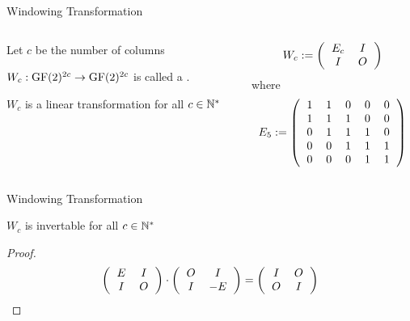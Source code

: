 \begin{frame}{Windowing Transformation}
	\begin{columns}[T]
		\begin{column}{0.45\linewidth}
			Let $c$ be the number of columns
			
			\bigskip
			
			\begin{definition}
				$W_{c} : \operatorname{GF}(2)^{2c} \rightarrow \operatorname{GF}(2)^{2c}$ is called
				a .
			\end{definition}
			
			\bigskip
			
			\begin{theorem}
				$W_{c}$ is a linear transformation for all $c \in \mathbb{N}^{*}$
			\end{theorem}
		\end{column}
		\begin{column}{0.45\linewidth}
			\[
				W_{c} := \left(
				\begin{tabular}{cc}
					$E_{c}$ & $I$ \\
					$I$ & $O$ \\
				\end{tabular}
				\right)
			\]
			where
			\[
				E_{5} := \left(
				\begin{tabular}{ccccc}
					1 & 1 & 0 & 0 & 0 \\
					1 & 1 & 1 & 0 & 0 \\
					0 & 1 & 1 & 1 & 0 \\
					0 & 0 & 1 & 1 & 1 \\
					0 & 0 & 0 & 1 & 1 \\
				\end{tabular}
				\right)
			\]
		\end{column}
	\end{columns}
\end{frame}

\begin{frame}{Windowing Transformation}
	\begin{lemma}
		$W_{c}$ is invertable for all $c \in \mathbb{N}^{*}$
	\end{lemma}
	
	\pause
	\bigskip
	
	\begin{proof}
		\[
			\left(
			\begin{tabular}{cc}
				$E$ & $I$ \\
				$I$ & $O$ \\
			\end{tabular}
			\right)
			\cdot
			\left(
			\begin{tabular}{cc}
				$O$ & $I$ \\
				$I$ & $-E$ \\
			\end{tabular}
			\right)
			=
			\left(
			\begin{tabular}{cc}
				$I$ & $O$ \\
				$O$ & $I$ \\
			\end{tabular}			
			\right)
		\]
	\end{proof}
\end{frame}

